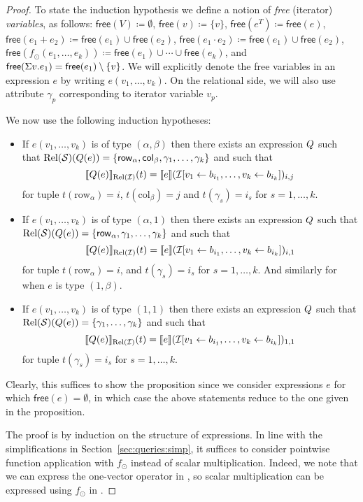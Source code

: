 \begin{proof}
To state the induction hypothesis we define a notion of \textit{free} (iterator) \textit{variables}, as follows:
$\mathsf{free}(V)\coloneqq \emptyset$, $\mathsf{free}(v)\coloneqq \{v\}$, $\mathsf{free}(e^T)\coloneqq \mathsf{free}(e)$, $\mathsf{free}(e_1+e_2)\coloneqq \mathsf{free}(e_1)\cup \mathsf{free}(e_2)$, $\mathsf{free}(e_1\cdot e_2)\coloneqq \mathsf{free}(e_1)\cup \mathsf{free}(e_2)$,
 $\mathsf{free}(f_\odot(e_1,\ldots,e_k))\coloneqq \mathsf{free}(e_1)\cup\cdots \cup \mathsf{free}(e_k)$, and $\mathsf{free}(\Sigma v. e_1)=\mathsf{free}(e_1)\setminus\{v\}$. We will explicitly denote the free variables in an expression $e$ by writing $e(v_1,\ldots,v_k)$.
On the relational side, we will also use attribute $\gamma_p$ corresponding to iterator variable $v_p$.

We now use the following induction hypotheses:
\begin{itemize}
	\item If $e(v_1,\ldots,v_k)$ is of type $(\alpha,\beta)$ then there exists an
	\rak expression $Q$ such that $\text{Rel}(\mathcal{S})(Q(e))=\{\mathsf{row}_\alpha,\mathsf{col}_\beta,\gamma_1,\ldots,\gamma_k\}$
	and such that 
	$$
	\llbracket Q(e) \rrbracket_{\text{Rel}(\mathcal{I})}(t)=\llbracket e \rrbracket(\mathcal{I}[v_1\gets b_{i_1},\ldots,v_k\gets b_{i_k}])_{i,j}
	$$
	for tuple $t(\mathrm{row}_\alpha)=i$, $t(\mathrm{col}_\beta)=j$ and $t(\gamma_s)=i_s$ for $s=1,\ldots, k$.
	\item If $e(v_1,\ldots,v_k)$ is of type $(\alpha,1)$ then there exists an
	\rak expression $Q$ such that $\text{Rel}(\mathcal{S})(Q(e))=\{\mathsf{row}_\alpha,\gamma_1,\ldots,\gamma_k\}$
	and such that 
	$$
	\llbracket Q(e) \rrbracket_{\text{Rel}(\mathcal{I})}(t)=\llbracket e \rrbracket(\mathcal{I}[v_1\gets b_{i_1},\ldots,v_k\gets b_{i_k}])_{i,1}
	$$
	for tuple $t(\mathrm{row}_\alpha)=i$,  and $t(\gamma_s)=i_s$ for $s=1,\ldots, k$.
	And similarly for when $e$ is type $(1,\beta)$.
	\item If $e(v_1,\ldots,v_k)$ is of type $(1,1)$ then there exists an
	\rak expression $Q$ such that $\text{Rel}(\mathcal{S})(Q(e))=\{\gamma_1,\ldots,\gamma_k\}$
	and such that 
	$$
	\llbracket Q(e) \rrbracket_{\text{Rel}(\mathcal{I})}(t)=\llbracket e \rrbracket(\mathcal{I}[v_1\gets b_{i_1},\ldots,v_k\gets b_{i_k}])_{1,1}
	$$
	for tuple $t(\gamma_s)=i_s$ for $s=1,\ldots, k$.
\end{itemize}
Clearly, this suffices to show the proposition since we consider expressions $e$ for which $\mathsf{free}(e)=\emptyset$, in which case the above statements reduce to the one given in the proposition.


The proof is by induction on the structure of \langsum expressions. In line with the simplifications in Section~\ref{sec:queries:simp}, it suffices to consider pointwise function application with $f_\odot$ instead of scalar multiplication. Indeed, we note that we can express the one-vector operator in \langsum, so scalar multiplication can be expressed using $f_\odot$ in \langsum.


\end{proof}
